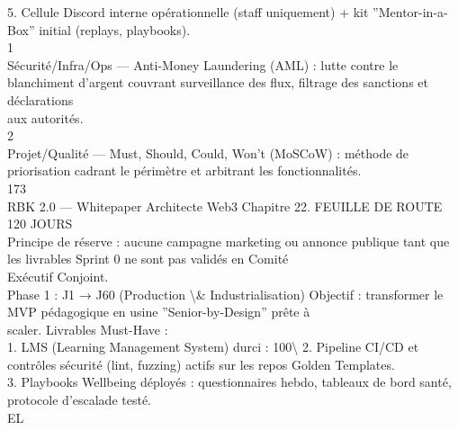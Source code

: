 \documentclass[12pt,landscape,a4paper]{article}
\begin{document}
\vspace{0.5em}
5. Cellule Discord interne opérationnelle (staff uniquement) + kit ”Mentor-in-a-Box” initial (replays, playbooks).\\
1\\
Sécurité/Infra/Ops — Anti-Money Laundering (AML) : lutte contre le blanchiment d’argent couvrant surveillance des flux, filtrage des sanctions et déclarations\\
aux autorités.\\
2\\
Projet/Qualité — Must, Should, Could, Won’t (MoSCoW) : méthode de priorisation cadrant le périmètre et arbitrant les fonctionnalités.\\
\vspace{0.5em}
\vspace{0.5em}
173\\
RBK 2.0 — Whitepaper Architecte Web3                                                               Chapitre 22. FEUILLE DE ROUTE 120 JOURS\\
\vspace{0.5em}
\vspace{0.5em}
Principe de réserve : aucune campagne marketing ou annonce publique tant que les livrables Sprint 0 ne sont pas validés en Comité\\
Exécutif Conjoint.\\
\vspace{0.5em}
Phase 1 : J1 → J60 (Production \textbackslash{}& Industrialisation)       Objectif : transformer le MVP pédagogique en usine ”Senior-by-Design” prête à\\
scaler. Livrables Must-Have :\\
\vspace{0.5em}
1. LMS (Learning Management System) durci : 100\textbackslash{}%
\vspace{0.5em}
2. Pipeline CI/CD et contrôles sécurité (lint, fuzzing) actifs sur les repos Golden Templates.\\
\vspace{0.5em}
3. Playbooks Wellbeing déployés : questionnaires hebdo, tableaux de bord santé, protocole d’escalade testé.\\
\vspace{0.5em}
\vspace{0.5em}
\vspace{0.5em}
\vspace{0.5em}
EL\\
\end{document}
